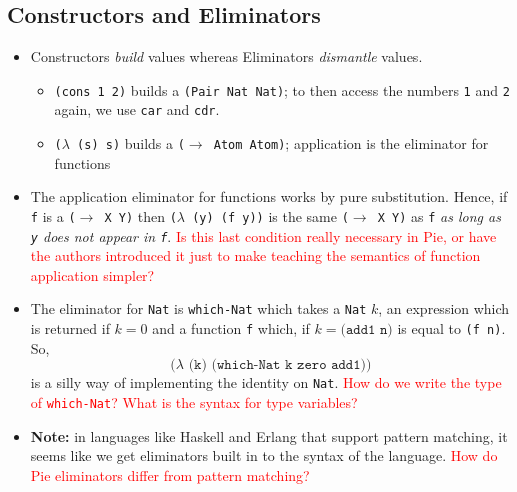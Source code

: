 \documentclass{article}
\newcommand{\ttt}[1]{\texttt{#1}}
\begin{document}
\subsection{Constructors and Eliminators}
\begin{itemize}
    \item Constructors \textit{build} values whereas Eliminators \textit{dismantle} values.
        \begin{itemize}
            \item \ttt{(cons 1 2)} builds a \ttt{(Pair Nat Nat)}; to then access the numbers \ttt{1} and \ttt{2} again, we use \ttt{car} and \ttt{cdr}.
            \item \ttt{(\(\lambda\) (s) s)} builds a \ttt{(\(\rightarrow\) Atom Atom)}; application is the eliminator for functions
        \end{itemize}
    \item The application eliminator for functions works by pure substitution. Hence, if \ttt{f} is a \ttt{(\(\rightarrow\) X Y)} then \ttt{(\(\lambda\) (y) (f y))} is the same \ttt{(\(\rightarrow\) X Y)} as \ttt{f} \textit{as long as \ttt{y} does not appear in \ttt{f}}. \textcolor{red}{Is this last condition really necessary in Pie, or have the authors introduced it just to make teaching the semantics of function application simpler?}
    \item The eliminator for \ttt{Nat} is \ttt{which-Nat} which takes a \ttt{Nat} \(k\), an expression which is returned if \(k = 0\) and a function \ttt{f} which, if \(k = \ttt{(add1 n)}\) is equal to \ttt{(f n)}. So, \[
        \ttt{(\(\lambda\) (k) (which-Nat k zero add1))}
    \]
    is a silly way of implementing the identity on \ttt{Nat}. \textcolor{red}{How do we write the type of \ttt{which-Nat}? What is the syntax for type variables?}
    \item \textbf{Note:} in languages like Haskell and Erlang that support pattern matching, it seems like we get eliminators built in to the syntax of the language. \textcolor{red}{How do Pie eliminators differ from pattern matching?}
\end{itemize}
\end{document}
